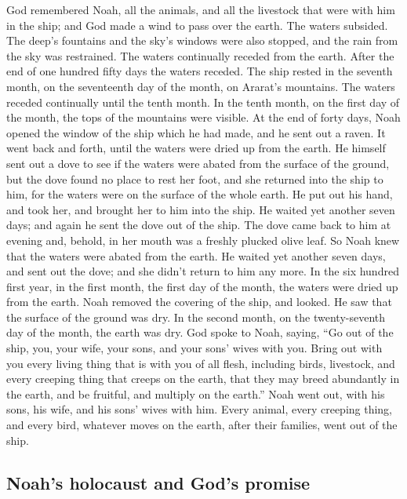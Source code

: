  God remembered Noah, all the animals, and all the
livestock that were with him in the ship; and God made a wind to pass
over the earth. The waters subsided.  The deep's fountains
and the sky's windows were also stopped, and the rain from the sky was
restrained.  The waters continually receded from the
earth. After the end of one hundred fifty days the waters receded.
 The ship rested in the seventh month, on the seventeenth
day of the month, on Ararat's mountains.  The waters
receded continually until the tenth month. In the tenth month, on the
first day of the month, the tops of the mountains were visible.
 At the end of forty days, Noah opened the window of the
ship which he had made,  and he sent out a raven. It went
back and forth, until the waters were dried up from the earth.
 He himself sent out a dove to see if the waters were
abated from the surface of the ground,  but the dove found
no place to rest her foot, and she returned into the ship to him, for
the waters were on the surface of the whole earth. He put out his hand,
and took her, and brought her to him into the ship.  He
waited yet another seven days; and again he sent the dove out of the
ship.  The dove came back to him at evening and, behold,
in her mouth was a freshly plucked olive leaf. So Noah knew that the
waters were abated from the earth.  He waited yet another
seven days, and sent out the dove; and she didn't return to him any
more.  In the six hundred first year, in the first month,
the first day of the month, the waters were dried up from the earth.
Noah removed the covering of the ship, and looked. He saw that the
surface of the ground was dry.  In the second month, on
the twenty-seventh day of the month, the earth was dry. 
God spoke to Noah, saying,  ``Go out of the ship, you,
your wife, your sons, and your sons' wives with you. 
Bring out with you every living thing that is with you of all flesh,
including birds, livestock, and every creeping thing that creeps on the
earth, that they may breed abundantly in the earth, and be fruitful, and
multiply on the earth.''  Noah went out, with his sons,
his wife, and his sons' wives with him.  Every animal,
every creeping thing, and every bird, whatever moves on the earth, after
their families, went out of the ship.

\hypertarget{noahs-holocaust-and-gods-promise}{%
\subsection{Noah's holocaust and God's
promise}\label{noahs-holocaust-and-gods-promise}}

